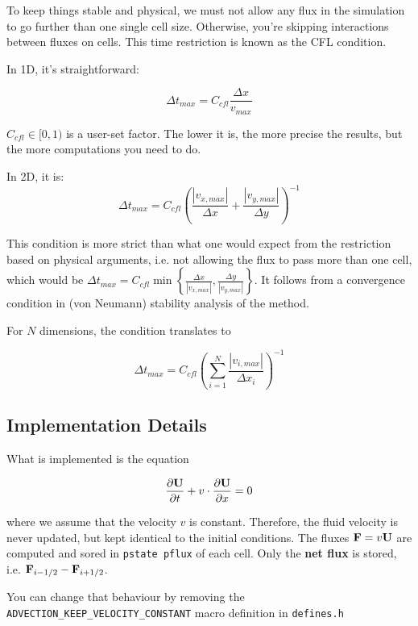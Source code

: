 To keep things stable and physical, we must not allow any flux in the simulation to go further than one single cell size.
Otherwise, you're skipping interactions between fluxes on cells.
This time restriction is known as the CFL condition.

In 1D, it's straightforward:

\begin{equation}
	\Delta t_{max} = C_{cfl} \frac{\Delta x}{v_{max}} \label{eq:CFL1D}
\end{equation}

$C_{cfl} \in [0, 1) $ is a user-set factor.
The lower it is, the more precise the results, but the more computations you need to do.

In 2D, it is:
\begin{equation}
	\Delta t_{max} = C_{cfl} \left( \frac{|v_{x,max}|}{\Delta x} +  \frac{|v_{y,max}|}{\Delta y} \right)^{-1} \label{eq:CFL2D}
\end{equation}

This condition is more strict than what one would expect from the restriction based on physical arguments, i.e. not allowing the flux to pass more than one cell, which would be $\Delta t_{max} = C_{cfl} \min \left\{ \frac{\Delta x}{|v_{x,max}|} ,  \frac{\Delta y}{|v_{y,max}|} \right\} $.
It follows from a convergence condition in (von Neumann) stability analysis of the method.

For $N$ dimensions, the condition translates to

\begin{equation}
	\Delta t_{max} = C_{cfl} \left( \sum_{i=1}^{N} \frac{|v_{i,max}|}{\Delta x_i} \right)^{-1}  \label{eq:CFLND}
\end{equation}


















\subsection{Implementation Details}

What is implemented is the equation

\begin{equation}
    \frac{\partial \mathbf{U}}{\partial t} + v \cdot \frac{\partial \mathbf{U}}{\partial x} = 0
\end{equation}


where we assume that the velocity $v$ is constant. 
Therefore, the fluid velocity is never updated, but kept identical to the initial conditions.
The fluxes $\mathbf{F} = v \mathbf{U}$ are computed and sored in \verb|pstate pflux| of each cell.
Only the \textbf{net flux} is stored, i.e. $\mathbf{F}_{i-1/2} - \mathbf{F}_{i+1/2}$.

You can change that behaviour by removing the \verb|ADVECTION_KEEP_VELOCITY_CONSTANT| macro definition in \verb|defines.h|

